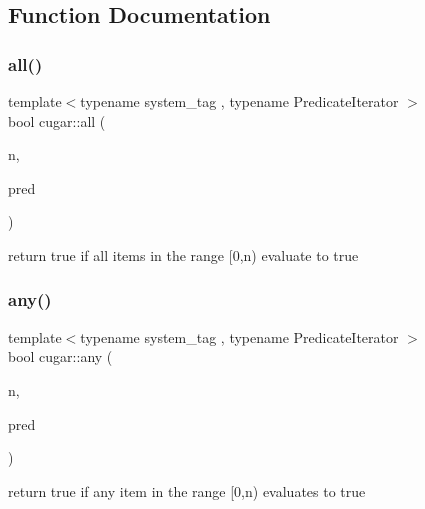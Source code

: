 \subsection{Function Documentation}
\mbox{\label{group___primitives_gaa98aa06ec6a5f38dda15d74ce0c47d57}} 
\subsubsection{\texorpdfstring{all()}{all()}}
{\footnotesize\ttfamily template$<$typename system\+\_\+tag , typename Predicate\+Iterator $>$ \\
bool cugar\+::all (\begin{DoxyParamCaption}\item[{const uint32}]{n,  }\item[{const Predicate\+Iterator}]{pred }\end{DoxyParamCaption})}

return true if all items in the range \mbox{[}0,n) evaluate to true \mbox{\label{group___primitives_ga71416af3e5407b31c78a10026520dbed}} 
\subsubsection{\texorpdfstring{any()}{any()}}
{\footnotesize\ttfamily template$<$typename system\+\_\+tag , typename Predicate\+Iterator $>$ \\
bool cugar\+::any (\begin{DoxyParamCaption}\item[{const uint32}]{n,  }\item[{const Predicate\+Iterator}]{pred }\end{DoxyParamCaption})}

return true if any item in the range \mbox{[}0,n) evaluates to true \mbox{\label{group___primitives_gaafc4aac8b44cf750c98a3a97fe72e5c6}} 
